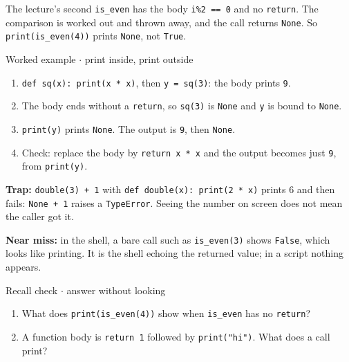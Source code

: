 \documentclass[11pt]{article}
\begin{document}
\begin{keepsection}
The lecture’s second \texttt{is\_even} has the body \texttt{i\%2 == 0} and no \texttt{return}. The comparison is worked out and thrown away, and the call returns \texttt{None}. So \texttt{print(is\_even(4))} prints \texttt{None}, not \texttt{True}.

\begin{workedbox}{Worked example \ensuremath{\cdot} print inside, print outside}
\begin{enumerate}
\item \texttt{def sq(x): print(x * x)}, then \texttt{y = sq(3)}: the body prints \texttt{9}.
\item The body ends without a \texttt{return}, so \texttt{sq(3)} is \texttt{None} and \texttt{y} is bound to \texttt{None}.
\item \texttt{print(y)} prints \texttt{None}. The output is \texttt{9}, then \texttt{None}.
\item Check: replace the body by \texttt{return x * x} and the output becomes just \texttt{9}, from \texttt{print(y)}.
\end{enumerate}
\end{workedbox}

\begin{notebox}\textbf{Trap:} \texttt{double(3) + 1} with \texttt{def double(x): print(2 * x)} prints 6 and then fails: \texttt{None + 1} raises a \texttt{TypeError}. Seeing the number on screen does not mean the caller got it.\end{notebox}

\begin{notebox}\textbf{Near miss:} in the shell, a bare call such as \texttt{is\_even(3)} shows \texttt{False}, which looks like printing. It is the shell echoing the returned value; in a script nothing appears.\end{notebox}

\begin{recallbox}{Recall check \ensuremath{\cdot} answer without looking}
\begin{enumerate}
\item What does \texttt{print(is\_even(4))} show when \texttt{is\_even} has no \texttt{return}?
\item A function body is \texttt{return 1} followed by \texttt{print("hi")}. What does a call print?
\end{enumerate}

\end{recallbox}
\end{keepsection}
\end{document}

